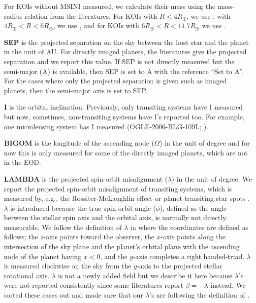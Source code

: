\documentclass[11pt,preprint]{aastex}
\def\rearth{R_\oplus}
\begin{document}
\begin{CJK*}{UTF8}{gbsn}
For KOIs without MSINI measured, we calculate their mass using the
mass-radius relation from the literatures. For KOIs with $R<4\rearth$,
we use \cite{Weiss2014} , with $4\rearth<R<6\rearth$, we use
\cite{Lissauer2011}, and for KOIs with $6\rearth<R<11.7\rearth$ we use
\cite{Mordasini2012}.  

{\bf SEP} is the projected separation on the sky between the host star
and the planet in the unit of AU. For directly imaged planets, the
literatures give the projected separation and we report this value.
If SEP is not directly measured but the semi-major (A) is available,
then SEP is set to A with the reference ``Set to A''. For the cases
where only the projected separation is given such as imaged planets,
then the semi-major axis is set to SEP.

{\bf I} is the orbital inclination. Previously, only transiting
systems have I measured but now, sometimes, non-transiting systems
have I's reported too. For example, one microlensing system has I
measured (OGLE-2006-BLG-109L; \citealt{Bennet2010}).  

{\bf BIGOM} is the longitude of the ascending node ($\Omega$) in the
unit of degree and for now this is only measured for some of the
directly imaged planets, which are not in the EOD.

{\bf LAMBDA} is the projected spin-orbit misalignment ($\lambda$) in
the unit of degree. We report the projected spin-orbit misalignment of
transiting systems, which is measured by, e.g., the
Rossiter-McLaughlin effect \citep[e.g.,][]{Winn2005} or planet
transiting star spots \citep[e.g.,][]{Sanchis-Ojeda2012}. $\lambda$ is
introduced because the true spin-orbit angle ($\phi$), defined as the
angle between the stellar spin axis and the orbital axis, is normally
not directly measurable. We follow the definition of $\lambda$ in
\cite{Fabrycky2009} where the coordinates are defined as follows; the
$z$-axis points toward the observer, the $x$-axis points along the
intersection of the sky plane and the planet's orbital plane with the
ascending node of the planet having $x<0$, and the $y$-axis completes
a right handed-triad. $\lambda$ is measured clockwise on the sky from
the $y$-axis to the projected stellar rotational axis. $\lambda$ is
not a newly added field but we describe it here because $\lambda$'s
were not reported consistently since some literatures report $\beta =
-\lambda$ instead. We sorted these cases out and made sure that our
$\lambda$'s are following the definition of \cite{Fabrycky2009}.


\end{CJK*}
\end{document}
